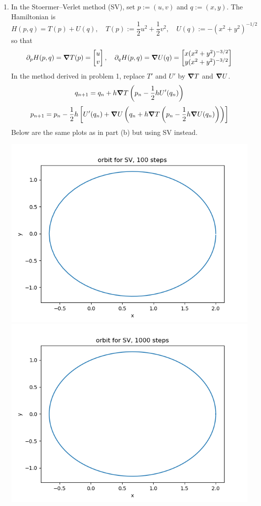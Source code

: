 \documentclass{article}
\newcommand{\br}[1]{\left(#1\right)}
\newcommand{\sbr}[1]{\left[#1\right]}
\newcommand{\m}[2][b]{\begin{#1matrix}#2\end{#1matrix}}
\newcommand{\ptl}{\partial}
\begin{document}
\begin{enumerate}
\begin{enumerate}[label=(\alph*)]
	
	\item In the Stoermer--Verlet method (SV), set $p:=(u,v)$ and $q:=(x,y)$. The Hamiltonian is
	$$H(p,q) = T(p) + U(q),
	\quad T(p) := \frac12u^2 + \frac12v^2,
	\quad U(q) := -(x^2 + y^2)^{-1/2}$$
	so that
	$$\ptl_pH(p,q) = \grad T(p) = \m{u \\ v},
	\quad \ptl_qH(p,q) = \grad U(q) = \m{x(x^2+y^2)^{-3/2} \\ y(x^2+y^2)^{-3/2}}$$
	In the method derived in problem 1, replace $T'$ and $U'$ by $\grad T$ and $\grad U$.
	$$q_{n+1} = q_n + h\grad T\br{p_n - \frac12hU'(q_n)}$$
	$$p_{n+1} = p_n - \frac12h\sbr{U'(q_n) + \grad U\br{q_n + h\grad T\br{p_n - \frac12h\grad U(q_n)}}}$$
	Below are the same plots as in part (b) but using SV instead.
	
	\begin{center}
		\includegraphics[scale=.3]{hw5 SV orbit 100 steps}
		\includegraphics[scale=.3]{hw5 SV orbit 1000 steps}

\end{center}
\end{enumerate}
\end{enumerate}
\end{document}
